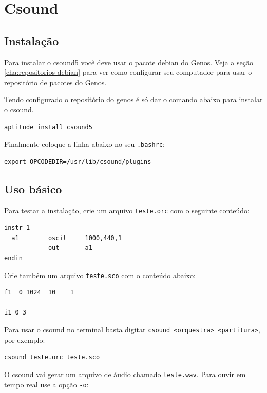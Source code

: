 \documentclass[12pt,brazil]{book}
\begin{document}
\chapter{Csound}
\label{cha:csound}

\section{Instalação}
\label{sec:instalacao-4}

Para instalar o csound5 você deve usar o pacote debian do Genos. Veja
a seção \ref{cha:repositorios-debian} para ver como configurar seu
computador para usar o repositório de pacotes do Genos.

Tendo configurado o repositório do genos é só dar o comando abaixo
para instalar o csound.

\begin{verbatim}
aptitude install csound5
\end{verbatim}

Finalmente coloque a linha abaixo no seu \texttt{.bashrc}:

\begin{verbatim}
export OPCODEDIR=/usr/lib/csound/plugins
\end{verbatim}

\section{Uso básico}
\label{sec:uso-basico-2}

Para testar a instalação, crie um arquivo \texttt{teste.orc} com o seguinte
conteúdo:

\begin{verbatim}
instr 1
  a1        oscil     1000,440,1
            out       a1       
endin
\end{verbatim}

Crie também um arquivo \texttt{teste.sco} com o conteúdo abaixo:

\begin{verbatim}
f1  0 1024  10    1

i1 0 3
\end{verbatim}

Para usar o csound no terminal basta digitar \texttt{csound
  <orquestra> <partitura>}, por exemplo:

\begin{verbatim}
csound teste.orc teste.sco
\end{verbatim}

O csound vai gerar um arquivo de áudio chamado \texttt{teste.wav}.
Para ouvir em tempo real use a opção \texttt{-o}:
\end{document}
